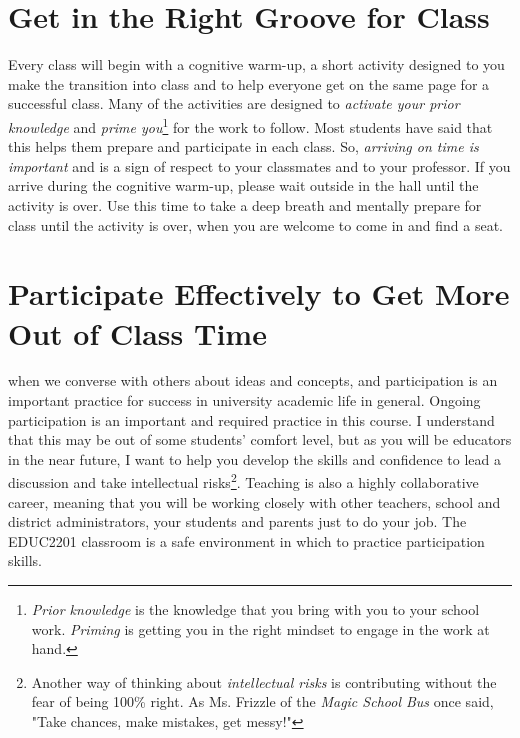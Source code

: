 \documentclass{tufte-handout}
\begin{document}
\section{Get in the Right Groove for Class}
Every class will begin with a \textsf{cognitive warm-up}, a short activity designed to you make the transition into class and to help everyone get on the same page for a successful class. Many of the activities are designed to \textit{activate your prior knowledge} and \textit{prime you}\footnote{\textit{Prior knowledge} is the knowledge that you bring with you to your school work. \textit{Priming} is getting you in the right mindset to engage in the work at hand.} for the work to follow. Most students have said that this helps them prepare and participate in each class. So, \textit{arriving on time is important} and is a sign of respect to your classmates and to your professor. If you arrive during the cognitive warm-up, please wait outside in the hall until the activity is over. Use this time to take a deep breath and mentally prepare for class until the activity is over, when you are welcome to come in and find a seat.

\section{Participate Effectively to Get More Out of Class Time}
 when we converse with others about ideas and concepts, and participation is an important practice for success in university academic life in general. Ongoing participation is an important and required practice in this course. I understand that this may be out of some students' comfort level, but as you will be educators in the near future, I want to help you develop the skills and confidence to lead a discussion and take intellectual risks\footnote{Another way of thinking about \textit{intellectual risks} is contributing without the fear of being 100\% right. As Ms. Frizzle of the \textit{Magic School Bus} once said, "Take chances, make mistakes, get messy!"}. Teaching is also a highly collaborative career, meaning that you will be working closely with other teachers, school and district administrators, your students and parents just to do your job. The EDUC2201 classroom is a safe environment in which to practice participation skills.
\end{document}
